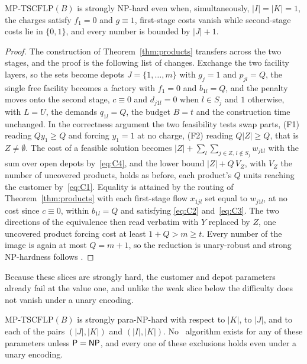 \begin{corollary}\label{cor:mirror}
$\mathrm{MP\text{-}TSCFLP}(B)$ is strongly NP-hard even when,
simultaneously, $|I|=|K|=1$, the charges satisfy $f_1=0$ and $g\equiv 1$,
first-stage costs vanish while second-stage costs lie in $\{0,1\}$, and
every number is bounded by $|J|+1$.
\end{corollary}

\begin{proof}
The construction of Theorem~\ref{thm:products} transfers across the two
stages, and the proof is the following list of changes. Exchange the
two facility layers, so the sets become depots $J=\{1,\dots,m\}$ with
$g_j=1$ and $p_{jl}=Q$, the single free facility becomes a factory with
$f_1=0$ and $b_{1l}=Q$, and the penalty moves onto the second stage,
$c\equiv 0$ and $d_{j1l}=0$ when $l\in S_j$ and $1$ otherwise, with
$L=U$, the demands $q_{1l}=Q$, the budget $B=t$ and the construction
time unchanged. In the correctness argument the two feasibility tests
swap parts, (F1) reading $Qy_1\ge Q$ and forcing $y_1=1$ at no charge,
(F2) reading $Q|Z|\ge Q$, that is $Z\ne\emptyset$. The cost of a
feasible solution becomes
$|Z|+\sum_l\sum_{j\in Z,\,l\notin S_j}w_{j1l}$ with the sum over open
depots by~\eqref{eq:C4}, and the lower bound $|Z|+Q\,V_Z$, with $V_Z$
the number of uncovered products, holds as before, each product's $Q$
units reaching the customer by~\eqref{eq:C1}. Equality is attained by
the routing of Theorem~\ref{thm:products} with each first-stage flow
$x_{1jl}$ set equal to $w_{j1l}$, at no cost since $c\equiv 0$, within
$b_{1l}=Q$ and satisfying \eqref{eq:C2} and~\eqref{eq:C3}. The two
directions of the equivalence then read verbatim with $Y$ replaced by
$Z$, one uncovered product forcing cost at least $1+Q>m\ge t$. Every
number of the image is again at most $Q=m+1$, so the reduction is
unary-robust and strong NP-hardness follows \citep{GareyJohnson1979}.
\end{proof}

Because these slices are strongly hard, the customer and depot parameters
already fail at the value one, and unlike the weak slice below the
difficulty does not vanish under a unary encoding.

\begin{corollary}\label{cor:parak}
$\mathrm{MP\text{-}TSCFLP}(B)$ is strongly para-NP-hard with respect to
$|K|$, to $|J|$, and to each of the pairs $(|J|,|K|)$ and $(|I|,|K|)$. No
\XP\ algorithm exists for any of these parameters unless $\textsf{P}=\textsf{NP}$, and
every one of these exclusions holds even under a unary encoding.
\end{corollary}

